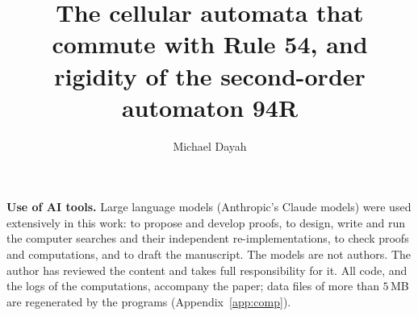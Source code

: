\documentclass[11pt]{amsart}
\title[The cellular automata that commute with Rule 54]{The cellular automata that commute with Rule 54, and rigidity of the second-order automaton 94R}
\author{Michael Dayah}
\theoremstyle{definition}
\theoremstyle{remark}
\begin{document}


\maketitle











\appendix



\medskip
\noindent\textbf{Use of AI tools.} Large language models (Anthropic's Claude models) were used extensively in this work: to propose and develop proofs, to design, write and run the computer searches and their independent re-implementations, to check proofs and computations, and to draft the manuscript. The models are not authors. The author has reviewed the content and takes full responsibility for it. All code, and the logs of the computations, accompany the paper; data files of more than $5$\,MB are regenerated by the programs (Appendix~\ref{app:comp}).


\end{document}
